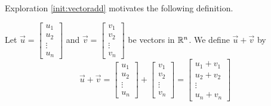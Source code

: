 \documentclass{ximera}
\begin{document}
Exploration \ref{init:vectoradd} motivates the following definition.
  \begin{definition}\label{def:vectoradd} 
  Let $\vec{u}=\begin{bmatrix}
u_1\\
u_2\\
\vdots\\
u_n
\end{bmatrix}$ and $\vec{v}=\begin{bmatrix}
v_1\\
v_2\\
\vdots\\
v_n
\end{bmatrix}$ be vectors in $\mathbb{R}^n$.  We define $\vec{u}+\vec{v}$ by
  $$\vec{u}+\vec{v}=\begin{bmatrix}
u_1\\
u_2\\
\vdots\\
u_n
\end{bmatrix}+\begin{bmatrix}
v_1\\
v_2\\
\vdots\\
v_n
\end{bmatrix}=\begin{bmatrix}
u_1+v_1\\
u_2+v_2\\
\vdots\\
u_n+v_n
\end{bmatrix}$$
  
\end{definition}
\end{document}
